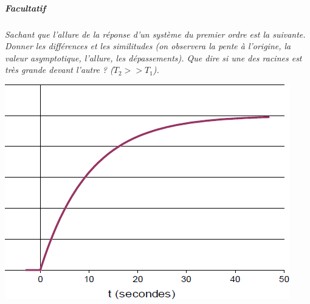 \documentclass[11pt,oneside]{article}
\begin{document}
\begin{minipage}[c]{.45\linewidth}

\subparagraph{Facultatif}
\textit{Sachant que l'allure de la réponse d'un système du premier ordre est la suivante. Donner les différences et les similitudes (on observera la pente à l'origine, la valeur asymptotique, l'allure,
les dépassements). Que dire si une des racines est très grande devant l'autre ?
($T_2 >> T_1$).}

\end{minipage}\hfill
\begin{minipage}[c]{.5\linewidth}
\begin{center}
\includegraphics[width=.95\textwidth]{png/image4}
\end{center}
\end{minipage}

\end{document}
